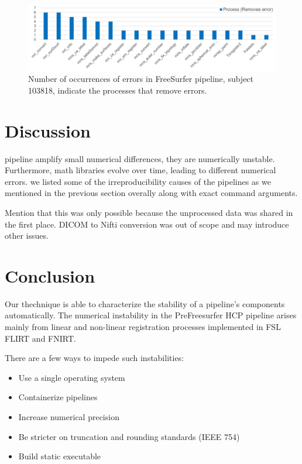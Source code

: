 \documentclass{article}
\begin{document}
{\begin{figure}[H]
\centering
  \includegraphics[scale=0.5]{images/fs_remove_table.png} 
  \caption{Number of occurrences of errors in FreeSurfer pipeline, 
subject 103818, indicate the processes that remove errors.}
  \label{fig:fs_remove_table}
\end{figure}


\section{Discussion}

pipeline amplify small numerical differences, they are numerically 
unstable. Furthermore, math libraries evolve over time, leading to 
different numerical errors. we listed some of the irreproducibility 
causes of the pipelines as we mentioned in the previous section 
overally along with exact command arguments.

Mention that this was only possible because the unprocessed data was shared in the first place.
DICOM to Nifti conversion was out of scope and may introduce other issues.

\section{Conclusion}

Our thechnique is able to characterize the stability of a pipeline's components automatically.
The numerical instability in the PreFreesurfer HCP pipeline arises mainly from
linear and non-linear registration processes implemented in FSL FLIRT and FNIRT. 

There are a few ways to impede such instabilities:
\begin{itemize}
\item Use a single operating system
\item Containerize pipelines
\item Increase numerical precision
\item Be stricter on truncation and rounding standards (IEEE 754)
\item Build static executable
\end{itemize}

}
\end{document}
